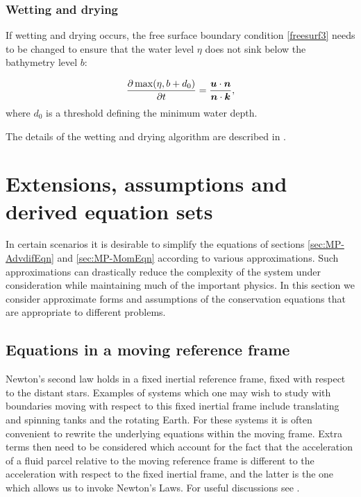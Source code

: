 \subsubsection{Wetting and drying}\label{sec:WD}
If wetting and drying occurs, the free surface boundary condition \ref{freesurf3} needs to be changed to ensure that the water level $\eta$ does not sink below the bathymetry level $b$:

\begin{equation}\label{eq:wd1}
\frac{\partial \max(\eta, b+d_0)}{\partial t}=\frac{{\mbox{\boldmath$u$}} \cdot {\mbox{\boldmath$n$}}}{{\mbox{\boldmath$n$}} \cdot {\mbox{\boldmath$k$}}},
\end{equation}
where $d_0$ is a threshold defining the minimum water depth.

The details of the wetting and drying algorithm are described in \cite{Funke2011}.

\section{Extensions, assumptions and derived equation sets}\label{sec:eqn_extensions}

In certain scenarios it is desirable to simplify the equations of sections \ref{sec:MP-AdvdifEqn} and \ref {sec:MP-MomEqn} according to various approximations. Such approximations can drastically reduce the complexity of the system under consideration while maintaining much of the important physics. In this section we consider approximate forms and assumptions of the conservation equations that are appropriate to different problems.

\subsection{Equations in a moving reference frame}\label{sec:coriolis}
Newton's second law holds in a fixed inertial reference frame, \ie
fixed with respect to the distant stars.
Examples of systems which one may wish to study with boundaries moving
with respect to this fixed inertial frame include translating and spinning tanks
and the rotating Earth. For these systems it is often convenient to rewrite the
underlying equations within the moving frame. Extra terms then need to be considered
which account for the fact that the acceleration of a fluid parcel relative to the
moving reference frame is different to the acceleration with respect to the fixed
inertial frame, and the latter is the one which allows us to invoke Newton's Laws.
For useful discussions see \citep{batchelor1967,cushman1994,gill1982}.

